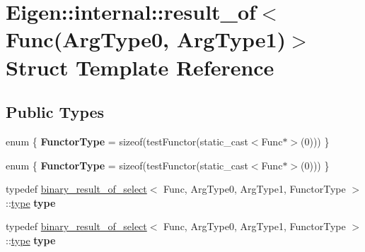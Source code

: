 \hypertarget{struct_eigen_1_1internal_1_1result__of_3_01_func_07_arg_type0_00_01_arg_type1_08_4}{}\section{Eigen\+:\+:internal\+:\+:result\+\_\+of$<$ Func(Arg\+Type0, Arg\+Type1)$>$ Struct Template Reference}
\label{struct_eigen_1_1internal_1_1result__of_3_01_func_07_arg_type0_00_01_arg_type1_08_4}
\subsection*{Public Types}
\begin{DoxyCompactItemize}
\item 
\mbox{\label{struct_eigen_1_1internal_1_1result__of_3_01_func_07_arg_type0_00_01_arg_type1_08_4_ad3f37f41878a5d43524121655815c988}} 
enum \{ {\bfseries Functor\+Type} = sizeof(test\+Functor(static\+\_\+cast$<$Func$\ast$$>$(0)))
 \}
\item 
\mbox{\label{struct_eigen_1_1internal_1_1result__of_3_01_func_07_arg_type0_00_01_arg_type1_08_4_a93a4dba8dd8b427bf641330d46e50217}} 
enum \{ {\bfseries Functor\+Type} = sizeof(test\+Functor(static\+\_\+cast$<$Func$\ast$$>$(0)))
 \}
\item 
\mbox{\label{struct_eigen_1_1internal_1_1result__of_3_01_func_07_arg_type0_00_01_arg_type1_08_4_a9fc9de324fc8a6bbd2e9907ab2bcea49}} 
typedef \hyperlink{struct_eigen_1_1internal_1_1binary__result__of__select}{binary\+\_\+result\+\_\+of\+\_\+select}$<$ Func, Arg\+Type0, Arg\+Type1, Functor\+Type $>$\+::\hyperlink{group___sparse_core___module}{type} {\bfseries type}
\item 
\mbox{\label{struct_eigen_1_1internal_1_1result__of_3_01_func_07_arg_type0_00_01_arg_type1_08_4_a9fc9de324fc8a6bbd2e9907ab2bcea49}} 
typedef \hyperlink{struct_eigen_1_1internal_1_1binary__result__of__select}{binary\+\_\+result\+\_\+of\+\_\+select}$<$ Func, Arg\+Type0, Arg\+Type1, Functor\+Type $>$\+::\hyperlink{group___sparse_core___module}{type} {\bfseries type}
\end{DoxyCompactItemize}
